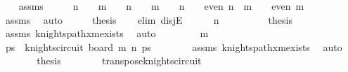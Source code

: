\begin{isabellebody}
%
\isadelimproof
\ \ %
\endisadelimproof
%
\isatagproof
{}\isamarkupfalse%
\ assms\isanewline
{}\isamarkupfalse%
\ {\isacharminus}{\kern0pt}\isanewline
\ \ \isamarkupfalse%
\ {\isachardoublequoteopen}n\ {\isacharequal}{\kern0pt}\ {}\ {\isasymor}\ m\ {\isacharequal}{\kern0pt}\ {}\ {\isasymor}\ n\ {\isacharequal}{\kern0pt}\ {}\ {\isasymor}\ m\ {\isacharequal}{\kern0pt}\ {}\ {\isasymor}\ {\isacharparenleft}{\kern0pt}n\ {\isasymge}\ {}{}\ {\isasymand}\ even\ n{\isacharparenright}{\kern0pt}\ {\isasymor}\ {\isacharparenleft}{\kern0pt}m\ {\isasymge}\ {}{}\ {\isasymand}\ even\ m{\isacharparenright}{\kern0pt}{\isachardoublequoteclose}\isanewline
\ \ \ \ \isamarkupfalse%
\ assms\ \isamarkupfalse%
\ auto\isanewline
\ \ \isamarkupfalse%
\ \isamarkupfalse%
\ {\isacharquery}{\kern0pt}thesis\isanewline
\ \ \isamarkupfalse%
\ {\isacharparenleft}{\kern0pt}elim\ disjE{\isacharparenright}{\kern0pt}\isanewline
\ \ \ \ \isamarkupfalse%
\ {\isachardoublequoteopen}n\ {\isacharequal}{\kern0pt}\ {}{\isachardoublequoteclose}\isanewline
\ \ \ \ \isamarkupfalse%
\ \isamarkupfalse%
\ {\isacharquery}{\kern0pt}thesis\isanewline
\ \ \ \ \ \ \isamarkupfalse%
\ assms\ knights{\isacharunderscore}{\kern0pt}path{\isacharunderscore}{\kern0pt}{}xm{\isacharunderscore}{\kern0pt}exists\ \isamarkupfalse%
\ auto\isanewline
\ \ \isamarkupfalse%
\isanewline
\ \ \ \ \isamarkupfalse%
\ {\isachardoublequoteopen}m\ {\isacharequal}{\kern0pt}\ {}{\isachardoublequoteclose}\isanewline
\ \ \ \ \isamarkupfalse%
\ \isamarkupfalse%
\ ps\ \ {\isachardoublequoteopen}knights{\isacharunderscore}{\kern0pt}circuit\ {\isacharparenleft}{\kern0pt}board\ m\ n{\isacharparenright}{\kern0pt}\ ps{\isachardoublequoteclose}\isanewline
\ \ \ \ \ \ \isamarkupfalse%
\ assms\ knights{\isacharunderscore}{\kern0pt}path{\isacharunderscore}{\kern0pt}{}xm{\isacharunderscore}{\kern0pt}exists\ \isamarkupfalse%
\ auto\isanewline
\ \ \ \ \isamarkupfalse%
\ \isamarkupfalse%
\ {\isacharquery}{\kern0pt}thesis\isanewline
\ \ \ \ \ \ \isamarkupfalse%
\ transpose{\isacharunderscore}{\kern0pt}knights{\isacharunderscore}{\kern0pt}circuit\ \isamarkupfalse%

\end{isabellebody}
